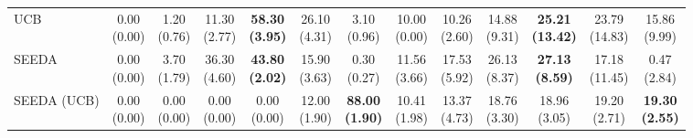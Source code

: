 \begin{table}[H]
{\begin{tabular}{l|cccccc|cccccc}
UCB & \makecell{0.00 \\ (0.00)} & \makecell{1.20 \\ (0.76)} & {\cellcolor[HTML]{C8E6C9}} \makecell{11.30 \\ (2.77)} & \bfseries \makecell{58.30 \\ (3.95)} & \makecell{26.10 \\ (4.31)} & \makecell{3.10 \\ (0.96)} & \makecell{10.00 \\ (0.00)} & \makecell{10.26 \\ (2.60)} & {\cellcolor[HTML]{C8E6C9}} \makecell{14.88 \\ (9.31)} & \bfseries \makecell{25.21 \\ (13.42)} & \makecell{23.79 \\ (14.83)} & \makecell{15.86 \\ (9.99)} \\
SEEDA & \makecell{0.00 \\ (0.00)} & \makecell{3.70 \\ (1.79)} & {\cellcolor[HTML]{C8E6C9}} \makecell{36.30 \\ (4.60)} & \bfseries \makecell{43.80 \\ (2.02)} & \makecell{15.90 \\ (3.63)} & \makecell{0.30 \\ (0.27)} & \makecell{11.56 \\ (3.66)} & \makecell{17.53 \\ (5.92)} & {\cellcolor[HTML]{C8E6C9}} \makecell{26.13 \\ (8.37)} & \bfseries \makecell{27.13 \\ (8.59)} & \makecell{17.18 \\ (11.45)} & \makecell{0.47 \\ (2.84)} \\
SEEDA (UCB) & \makecell{0.00 \\ (0.00)} & \makecell{0.00 \\ (0.00)} & {\cellcolor[HTML]{C8E6C9}} \makecell{0.00 \\ (0.00)} & \makecell{0.00 \\ (0.00)} & \makecell{12.00 \\ (1.90)} & \bfseries \makecell{88.00 \\ (1.90)} & \makecell{10.41 \\ (1.98)} & \makecell{13.37 \\ (4.73)} & {\cellcolor[HTML]{C8E6C9}} \makecell{18.76 \\ (3.30)} & \makecell{18.96 \\ (3.05)} & \makecell{19.20 \\ (2.71)} & \bfseries \makecell{19.30 \\ (2.55)} \\

\end{tabular}}
\end{table}
